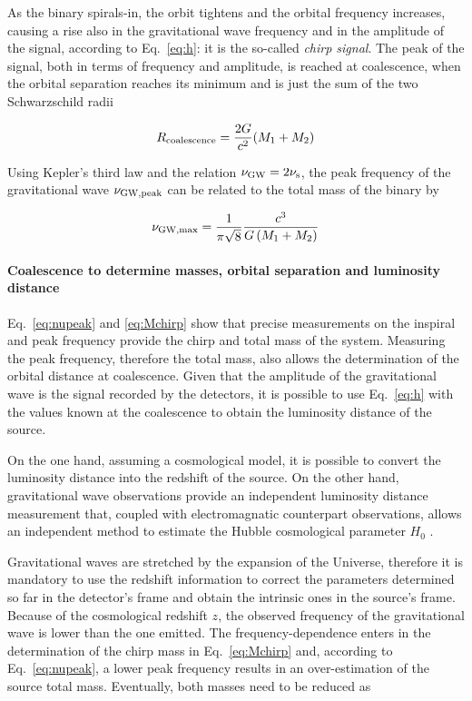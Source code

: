 \documentclass[a4paper,titlepage]{book}     	%
\begin{document}
As the binary spirals-in, the orbit tightens and the orbital frequency increases, causing a rise also in the gravitational wave frequency and in the amplitude of the signal, according to Eq.\ \ref{eq:h}: it is the so-called \emph{chirp signal}. The peak of the signal, both in terms of frequency and amplitude, is reached at coalescence, when the orbital separation reaches its minimum and is just the sum of the two Schwarzschild radii %

\begin{equation}\label{eq:Rcoalescence}
R_{\rm coalescence} = \frac{2G}{c^2} (M_1 + M_2)
\end{equation}

Using Kepler's third law and the relation $\nu_{\rm GW} = 2 \nu_{\rm s}$, the peak frequency of the gravitational wave $\nu_{\rm GW, peak}$ can be related to the total mass of the binary by


\begin{equation}\label{eq:nupeak}
	\nu_{\rm GW, max} = \frac{1}{\pi \sqrt{8}}\frac{c^3}{G\,{}(M_1+M_2)}
\end{equation}




\paragraph{Coalescence to determine masses, orbital separation and luminosity distance} Eq.\ \ref{eq:nupeak} and \ref{eq:Mchirp} show that precise measurements on the inspiral and peak frequency provide the chirp and total mass of the system. Measuring the peak frequency, therefore the total mass, also allows the determination of the orbital distance at coalescence. Given that the amplitude of the gravitational wave is the signal recorded by the detectors, it is possible to use Eq.\ \ref{eq:h} with the values known at the coalescence to obtain the luminosity distance of the source.


On the one hand, assuming a cosmological model, it is possible to convert the luminosity distance into the redshift of the source. On the other hand, gravitational wave observations provide an independent luminosity distance measurement that, coupled with electromagnatic counterpart observations, allows an independent method to estimate the Hubble cosmological parameter $H_0$ \cite{H0fromGW}.

Gravitational waves are stretched by the expansion of the Universe, therefore it is mandatory to use the redshift information to correct the parameters determined so far in the detector's frame and obtain the intrinsic ones in the source's frame. Because of the cosmological redshift $z$, the observed frequency of the gravitational wave is lower than the one emitted. The frequency-dependence enters in the determination of the chirp mass in Eq.\ \ref{eq:Mchirp} and, according to Eq.\ \ref{eq:nupeak}, a lower peak frequency results in an over-estimation of the source total mass. Eventually, both masses need to be reduced as
\end{document}
